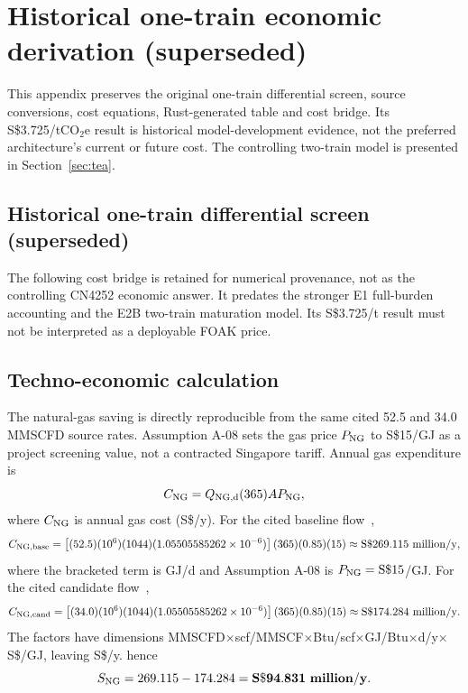 \section{Historical one-train economic derivation (superseded)}
\label{app:historical-economics}
This appendix preserves the original one-train differential screen, source conversions, cost equations, Rust-generated table and cost bridge. Its S\$3.725/tCO$_2$e result is historical model-development evidence, not the preferred architecture's current or future cost. The controlling two-train model is presented in Section~\ref{sec:tea}.

\subsection{Historical one-train differential screen (superseded)}
The following cost bridge is retained for numerical provenance, not as the controlling CN4252 economic answer. It predates the stronger E1 full-burden accounting and the E2B two-train maturation model. Its S\$3.725/t result must not be interpreted as a deployable FOAK price.

\subsection{Techno-economic calculation}
The natural-gas saving is directly reproducible from the same cited 52.5 and 34.0 MMSCFD source rates. Assumption A-08 sets the gas price $P_{\rm NG}$ to S\$15/GJ as a project screening value, not a contracted Singapore tariff. Annual gas expenditure is
\begin{equation}\label{eq:ng-cost-general}
C_{\rm NG}=Q_{\rm NG,d}(365)A P_{\rm NG},
\end{equation}
where $C_{\rm NG}$ is annual gas cost (S\$/y). For the cited baseline flow~\cite{inltev953},
\begin{equation}\label{eq:ng-cost-base}
C_{\rm NG,base}
=\left[(52.5)(10^6)(1044)(1.05505585262\times10^{-6})\right]
(365)(0.85)(15)
\approx\mathrm{S\$}269.115~\mathrm{million/y},
\end{equation}
where the bracketed term is GJ/d and Assumption A-08 is $P_{\rm NG}=\mathrm{S\$}15$/GJ. For the cited candidate flow~\cite{inltev961},
\begin{equation}\label{eq:ng-cost-candidate}
C_{\rm NG,cand}
=\left[(34.0)(10^6)(1044)(1.05505585262\times10^{-6})\right]
(365)(0.85)(15)
\approx\mathrm{S\$}174.284~\mathrm{million/y}.
\end{equation}
The factors have dimensions MMSCFD$\times$scf/MMSCF$\times$Btu/scf$\times$GJ/Btu$\times$d/y$\times$S\$/GJ, leaving S\$/y.
hence
\begin{equation}\label{eq:ng-saving}
S_{\rm NG}=269.115-174.284
=\mathbf{S\$94.831~million/y}.
\end{equation}

